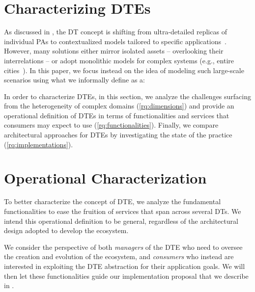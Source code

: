 \section{Characterizing \aclp{DTE}}
\label{sec:ecosystems}

As discussed in , the \ac{DT} concept is shifting from ultra-detailed replicas of individual \acp{PA} to contextualized models tailored to specific applications~\cite{minerva2020dtiot}.
%
However, many solutions either mirror isolated assets -- overlooking their interrelations -- or adopt monolithic models for complex systems (e.g., entire cities~\cite{Deren2021}).
%
In this paper, we focus instead on the idea of modeling such large-scale scenarios using what we informally define as a:


In order to characterize \acp{DTE}, in this section,
we analyze the challenges surfacing from the heterogeneity of complex domains (\ref{rq:dimensions})
and provide an operational definition of \acp{DTE} in terms of functionalities and services that consumers may expect to use (\ref{rq:functionalities}).
Finally, we compare architectural approaches for \acp{DTE} by investigating the state of the practice (\ref{rq:implementations}).


\section{Operational Characterization}
\label{sec:operational-characterization}

To better characterize the concept of \ac{DTE}, we analyze the fundamental functionalities to ease the fruition of services that span across several \acp{DT}.
%
We intend this operational definition to be general, regardless of the architectural design adopted to develop the ecosystem.

We consider the perspective of both \emph{managers} of the \ac{DTE} who need to oversee the creation and evolution of the ecosystem, and \emph{consumers} who instead are interested in exploiting the \ac{DTE} abstraction for their application goals.
%
We will then let these functionalities guide our implementation proposal that we describe in .

